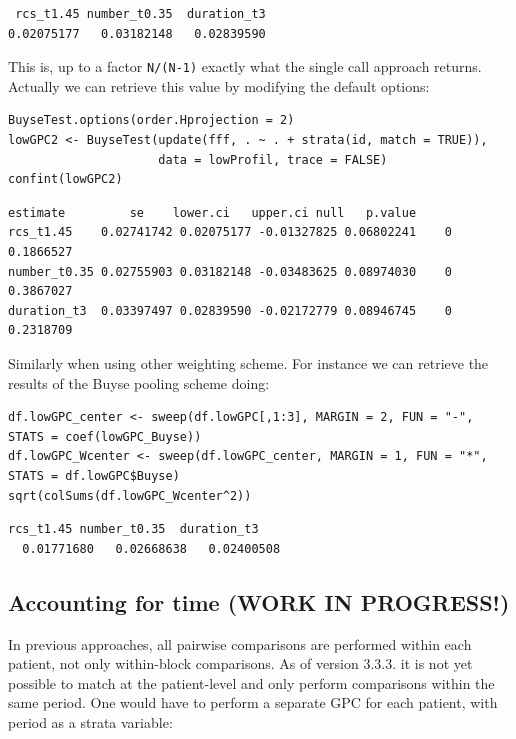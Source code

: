 \documentclass[12pt]{article}
\begin{document}
\begin{verbatim}
 rcs_t1.45 number_t0.35  duration_t3 
0.02075177   0.03182148   0.02839590
\end{verbatim}


\noindent This is, up to a factor \texttt{N/(N-1)} exactly what the single call
approach returns. Actually we can retrieve this value by modifying the default options:
\lstset{language=r,label= ,caption= ,captionpos=b,numbers=none}
\begin{lstlisting}
BuyseTest.options(order.Hprojection = 2)
lowGPC2 <- BuyseTest(update(fff, . ~ . + strata(id, match = TRUE)),
                     data = lowProfil, trace = FALSE)
confint(lowGPC2)
\end{lstlisting}

\begin{verbatim}
estimate         se    lower.ci   upper.ci null   p.value
rcs_t1.45    0.02741742 0.02075177 -0.01327825 0.06802241    0 0.1866527
number_t0.35 0.02755903 0.03182148 -0.03483625 0.08974030    0 0.3867027
duration_t3  0.03397497 0.02839590 -0.02172779 0.08946745    0 0.2318709
\end{verbatim}


\noindent  Similarly when using other weighting scheme. For instance we can
retrieve the results of the Buyse pooling scheme doing:
\lstset{language=r,label= ,caption= ,captionpos=b,numbers=none}
\begin{lstlisting}
df.lowGPC_center <- sweep(df.lowGPC[,1:3], MARGIN = 2, FUN = "-", STATS = coef(lowGPC_Buyse))
df.lowGPC_Wcenter <- sweep(df.lowGPC_center, MARGIN = 1, FUN = "*", STATS = df.lowGPC$Buyse)
sqrt(colSums(df.lowGPC_Wcenter^2))
\end{lstlisting}

\begin{verbatim}
rcs_t1.45 number_t0.35  duration_t3 
  0.01771680   0.02668638   0.02400508
\end{verbatim}


\clearpage

\subsection{Accounting for time (WORK IN PROGRESS!)}
\label{sec:orgd70176c}

In previous approaches, all pairwise comparisons are performed within
each patient, not only within-block comparisons. As of version
3.3.3. it is not yet possible to match at the patient-level and only
perform comparisons within the same period. One would have to perform
a separate GPC for each patient, with period as a strata variable:
\end{document}
